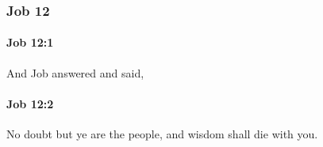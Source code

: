 	\subsubsection{Job 12} %
		\label{JOB-12}

		\paragraph{Job 12:1} %
			\label{JOB-12-1}

			And Job answered and said,


		\paragraph{Job 12:2} %
			\label{JOB-12-2}

			No doubt but ye are the people, and wisdom shall die with you.


